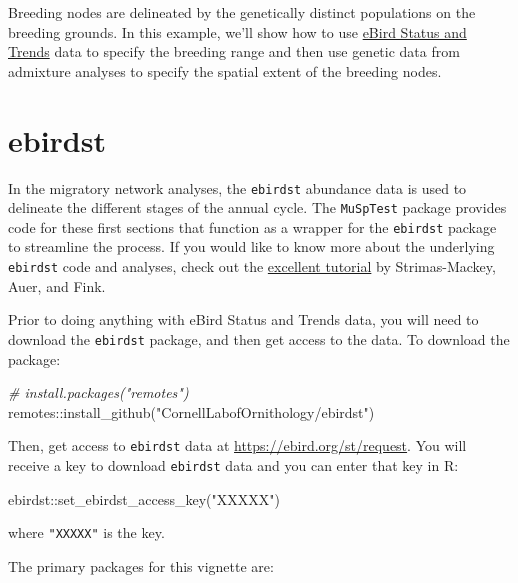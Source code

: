 \documentclass[
]{book}
\newenvironment{Shaded}{\begin{snugshade}}{\end{snugshade}}
\newcommand{\CommentTok}[1]{\textcolor[rgb]{0.56,0.35,0.01}{\textit{#1}}}
\newcommand{\FunctionTok}[1]{\textcolor[rgb]{0.00,0.00,0.00}{#1}}
\newcommand{\NormalTok}[1]{#1}
\newcommand{\SpecialCharTok}[1]{\textcolor[rgb]{0.00,0.00,0.00}{#1}}
\newcommand{\StringTok}[1]{\textcolor[rgb]{0.31,0.60,0.02}{#1}}
\begin{document}
Breeding nodes are delineated by the genetically distinct populations on the breeding grounds. In this example, we'll show how to use \href{https://ebird.org/science/status-and-trends}{eBird Status and Trends} data to specify the breeding range and then use genetic data from admixture analyses to specify the spatial extent of the breeding nodes.

\hypertarget{ebirdst}{%
\section{ebirdst}\label{ebirdst}}

In the migratory network analyses, the \texttt{ebirdst} abundance data is used to delineate the different stages of the annual cycle. The \texttt{MuSpTest} package provides code for these first sections that function as a wrapper for the \texttt{ebirdst} package to streamline the process. If you would like to know more about the underlying \texttt{ebirdst} code and analyses, check out the \href{https://cornelllabofornithology.github.io/ebirdst/articles/ebirdst-advanced-mapping.html}{excellent tutorial} by Strimas-Mackey, Auer, and Fink.

Prior to doing anything with eBird Status and Trends data, you will need to download the \texttt{ebirdst} package, and then get access to the data. To download the package:

\begin{Shaded}
\begin{Highlighting}[]
\CommentTok{\# install.packages("remotes")}
\NormalTok{remotes}\SpecialCharTok{::}\FunctionTok{install\_github}\NormalTok{(}\StringTok{"CornellLabofOrnithology/ebirdst"}\NormalTok{)}
\end{Highlighting}
\end{Shaded}

Then, get access to \texttt{ebirdst} data at \url{https://ebird.org/st/request}. You will receive a key to download \texttt{ebirdst} data and you can enter that key in R:

\begin{Shaded}
\begin{Highlighting}[]
\NormalTok{ebirdst}\SpecialCharTok{::}\FunctionTok{set\_ebirdst\_access\_key}\NormalTok{(}\StringTok{"XXXXX"}\NormalTok{)}
\end{Highlighting}
\end{Shaded}

where \texttt{"XXXXX"} is the key.

The primary packages for this vignette are:
\end{document}
